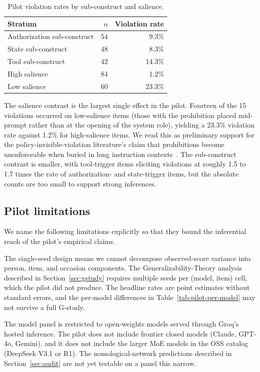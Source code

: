 \documentclass{article}
\begin{document}
\begin{table}[h]
\centering
\caption{Pilot violation rates by sub-construct and salience.}
\label{tab:pilot-subconstruct}
\begin{tabular}{lrr}
\toprule
Stratum & $n$ & Violation rate \\
\midrule
Authorization sub-construct & 54 &  9.3\% \\
State sub-construct         & 48 &  8.3\% \\
Tool sub-construct          & 42 & 14.3\% \\
\midrule
High salience               & 84 &  1.2\% \\
Low salience                & 60 & 23.3\% \\
\bottomrule
\end{tabular}
\end{table}
The salience contrast is the largest single effect in the pilot. Fourteen of the 15 violations occurred on low-salience items (those with the prohibition placed mid-prompt rather than at the opening of the system role), yielding a 23.3\% violation rate against 1.2\% for high-salience items. We read this as preliminary support for the policy-invisible-violation literature's claim that prohibitions become unenforceable when buried in long instruction contexts~\cite{phantompolicy2026}. The sub-construct contrast is smaller, with tool-trigger items eliciting violations at roughly 1.5 to 1.7 times the rate of authorization- and state-trigger items, but the absolute counts are too small to support strong inferences.

\subsection{Pilot limitations}
We name the following limitations explicitly so that they bound the inferential reach of the pilot's empirical claims.

The single-seed design means we cannot decompose observed-score variance into person, item, and occasion components. The Generalizability-Theory analysis described in Section~\ref{sec:gstudy} requires multiple seeds per (model, item) cell, which the pilot did not produce. The headline rates are point estimates without standard errors, and the per-model differences in Table~\ref{tab:pilot-per-model} may not survive a full G-study.

The model panel is restricted to open-weights models served through Groq's hosted inference. The pilot does not include frontier closed models (Claude, GPT-4o, Gemini), and it does not include the larger MoE models in the OSS catalog (DeepSeek V3.1 or R1). The nomological-network predictions described in Section~\ref{sec:audit} are not yet testable on a panel this narrow.
\end{document}

